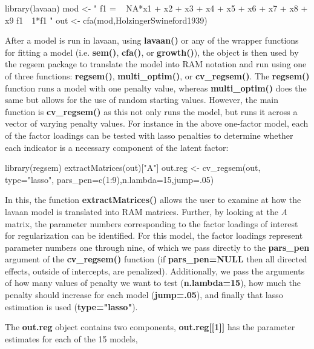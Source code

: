 \begin{Schunk}
\begin{Sinput}
library(lavaan)
mod <- "
f1 = ~ NA*x1 + x2 + x3 + x4 + x5 + x6 + x7 + x8 + x9
f1~~1*f1
"
out <- cfa(mod,HolzingerSwineford1939)
\end{Sinput}
\end{Schunk}

After a model is run in lavaan, using \textbf{lavaan()} or any of the
wrapper functions for fitting a model (i.e. \textbf{sem()},
\textbf{cfa()}, or \textbf{growth()}), the object is then used by the
regsem package to translate the model into RAM notation and run using
one of three functions: \textbf{regsem()}, \textbf{multi_optim()}, or
\textbf{cv_regsem()}. The \textbf{regsem()} function runs a model with
one penalty value, whereas \textbf{multi_optim()} does the same but
allows for the use of random starting values. However, the main function
is \textbf{cv_regsem()} as this not only runs the model, but runs it
across a vector of varying penalty values. For instance in the above
one-factor model, each of the factor loadings can be tested with lasso
penalties to determine whether each indicator is a necessary component
of the latent factor:

\begin{Schunk}
\begin{Sinput}
library(regsem)
extractMatrices(out)["A"]
out.reg <- cv_regsem(out, type="lasso", 
                    pars_pen=c(1:9),n.lambda=15,jump=.05)
\end{Sinput}
\end{Schunk}

In this, the function \textbf{extractMatrices()} allows the user to
examine at how the lavaan model is translated into RAM matrices.
Further, by looking at the \textit{A} matrix, the parameter numbers
corresponding to the factor loadings of interest for regularization can
be identified. For this model, the factor loadings represent parameter
numbers one through nine, of which we pass directly to the
\textbf{pars_pen} argument of the \textbf{cv_regsem()} function (if
\textbf{pars_pen=NULL} then all directed effects, outside of intercepts,
are penalized). Additionally, we pass the arguments of how many values
of penalty we want to test (\textbf{n.lambda=15}), how much the penalty
should increase for each model (\textbf{jump=.05}), and finally that
lasso estimation is used (\textbf{type="lasso"}).

The \textbf{out.reg} object contains two components,
\textbf{out.reg[[1]]} has the parameter estimates for each of the 15
models,

